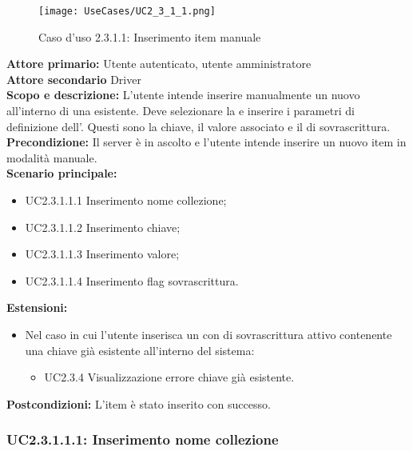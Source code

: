 \documentclass{scalatekids-article}
\begin{document}
\begin{figure}[H]
  \begin{center}
    \texttt{[image: UseCases/UC2\_3\_1\_1.png]}
    \caption*{Caso d'uso 2.3.1.1: Inserimento item manuale}
  \end{center}
\end{figure}
\textbf{Attore primario:} Utente autenticato, utente amministratore\\
\textbf{Attore secondario} Driver\\
\textbf{Scopo e descrizione:} L'utente intende inserire manualmente un nuovo  all'interno di una  esistente. Deve selezionare la  e inserire i parametri di definizione dell'. Questi sono la chiave, il valore associato e il  di sovrascrittura.\\
\textbf{Precondizione:} Il server è in ascolto e l'utente intende inserire un nuovo item in modalità manuale.\\
\textbf{Scenario principale:}
\begin{itemize}
\item UC2.3.1.1.1 Inserimento nome collezione;
\item UC2.3.1.1.2 Inserimento chiave;
\item UC2.3.1.1.3 Inserimento valore;
\item UC2.3.1.1.4 Inserimento flag sovrascrittura.
\end{itemize}
\textbf{Estensioni:}
\begin{itemize}
\item Nel caso in cui l'utente inserisca un  con  di sovrascrittura attivo contenente una chiave già esistente all'interno del sistema:
  \begin{itemize}
  \item UC2.3.4 Visualizzazione errore chiave già esistente.
  \end{itemize}
\end{itemize}
\textbf{Postcondizioni:} L'item è stato inserito con successo.

\subsubsection{UC2.3.1.1.1: Inserimento nome collezione}
\end{document}
